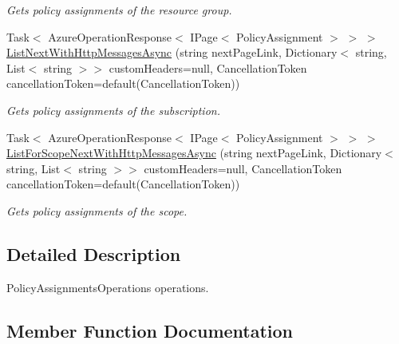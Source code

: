 \begin{DoxyCompactItemize}
\begin{DoxyCompactList}\small\item\em Gets policy assignments of the resource group. \end{DoxyCompactList}\item 
Task$<$ Azure\+Operation\+Response$<$ I\+Page$<$ Policy\+Assignment $>$ $>$ $>$ \hyperlink{interface_microsoft_1_1_azure_1_1_management_1_1_resources_1_1_i_policy_assignments_operations_af19b072e445b2ac95d9af18c70bad036}{List\+Next\+With\+Http\+Messages\+Async} (string next\+Page\+Link, Dictionary$<$ string, List$<$ string $>$$>$ custom\+Headers=null, Cancellation\+Token cancellation\+Token=default(Cancellation\+Token))
\begin{DoxyCompactList}\small\item\em Gets policy assignments of the subscription. \end{DoxyCompactList}\item 
Task$<$ Azure\+Operation\+Response$<$ I\+Page$<$ Policy\+Assignment $>$ $>$ $>$ \hyperlink{interface_microsoft_1_1_azure_1_1_management_1_1_resources_1_1_i_policy_assignments_operations_a0daa9136741415ac14336b4019b57646}{List\+For\+Scope\+Next\+With\+Http\+Messages\+Async} (string next\+Page\+Link, Dictionary$<$ string, List$<$ string $>$$>$ custom\+Headers=null, Cancellation\+Token cancellation\+Token=default(Cancellation\+Token))
\begin{DoxyCompactList}\small\item\em Gets policy assignments of the scope. \end{DoxyCompactList}\end{DoxyCompactItemize}


\subsection{Detailed Description}
Policy\+Assignments\+Operations operations. 



\subsection{Member Function Documentation}
